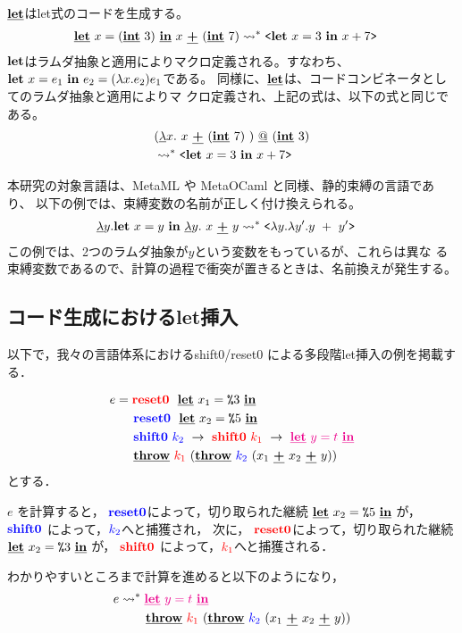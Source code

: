 $\cLet$はlet式のコードを生成する。
\begin{align*}
\cLet~ x = (\cint~3)~ \cIn~ x~ \cPlus~ (\cint~7)
  & \too \code{\Let~ x = 3~ \In~ x + 7} 
\end{align*}
$\Let$はラムダ抽象と適用によりマクロ定義される。すなわち、
$\letin{x}{e_1}{e_2} = (\fun{x}{e_2})e_1$である。
同様に、$\cLet$は、コードコンビネータとしてのラムダ抽象と適用によりマ
クロ定義され、上記の式は、以下の式と同じである。
\begin{align*}
& (\cfun{x}{~x~ \cPlus~ (\cint~7)~}) \cat (\cint~3)  \\
& \too \code{\Let~ x = 3~ \In~ x + 7} 
\end{align*}

本研究の対象言語は、MetaML や MetaOCaml と同様、静的束縛の言語であり、
以下の例では、束縛変数の名前が正しく付け換えられる。
\begin{align*}
\cfun{y}{\Let~ x = y~ \In~ \cfun{y}{~x~ \cPlus~ y}{}}{} 
& \too \code{\fun{y}{\fun{y'}{y~ +~ y'}}}
\end{align*}
この例では、2つのラムダ抽象が$y$という変数をもっているが、これらは異な
る束縛変数であるので、計算の過程で衝突が置きるときは、名前換えが発生する。

\subsection{コード生成におけるlet挿入}

以下で，我々の言語体系におけるshift0/reset0 による多段階let挿入の例を掲載する．

\begin{align*}
    e &= \red{\Resetz} ~~\cLet~x_1=\csp{3}~\cIn \\
      &\phantom{=}~~ \blue{\Resetz} ~~\cLet~x_2=\csp{5}~\cIn \\
      &\phantom{=}~~ \blue{\Shiftz}~\blue{k_2}~\to~ \red{\Shiftz}~\red{k_1}~\to~ \magenta{\cLet~y=t~\cIn} \\
      &\phantom{=}~~ \cThrow~\red{k_1}~(\cThrow~\blue{k_2}~(x_1~\cPlus~x_2~\cPlus~y))
\end{align*}
とする．

$e$ を計算すると，
$\blue{\Resetz}$によって，切り取られた継続 $\cLet~x_2=\csp{5}~\cIn$ が，
$\blue{\Shiftz}$ によって，$\blue{k_2}$へと捕獲され，
次に，
$\red{\Resetz}$によって，切り取られた継続 $\cLet~x_2=\csp{3}~\cIn$ が，
$\red{\Shiftz}$ によって，$\red{k_1}$へと捕獲される．

わかりやすいところまで計算を進めると以下のようになり，
\begin{align*}
  e & \too \magenta{\cLet~y=t~\cIn} \\
    & \phantom{\too}~~ \cThrow~\red{k_1}~(\cThrow~\blue{k_2}~(x_1~\cPlus~x_2~\cPlus~y))
\end{align*}

